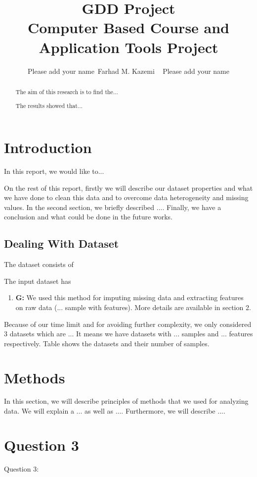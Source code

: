 \documentclass[12pt,letterpaper]{article}
\begin{document}
\title{GDD Project \\ \vspace{.5 cm} {\Large Computer Based Course and Application Tools Project} }
\author{Please add your name~Farhad M. Kazemi ~ Please add your name}
\maketitle
\begin{abstract}
The aim of this research is to find the...

The results showed that...
\end{abstract}

\section{Introduction}

In this report, we would like to...

On the rest of this report, firstly we will describe our dataset properties and what we have done to clean this data and to overcome data heterogeneity and missing values. In the second section, we briefly described ....
Finally, we have a conclusion and what could be done in the future works.
\subsection{Dealing With Dataset}
The dataset consists of 

The input dataset has 
\begin{enumerate}
\item \textbf{G:} We used this method for imputing missing data and extracting features on raw data (... sample with features). More details are available in section 2.
\end{enumerate}
\noindent Because of our time limit and for avoiding further complexity, we only considered 3 datasets which are ... 
It means we have datasets with ... samples and ... features respectively. Table shows the datasets and their number of samples.
\section{Methods}
In this section, we will describe principles of methods that we used for analyzing data. We will explain a ... as well as ....  Furthermore, we will describe .... 
\section{Question 3}
Question 3:
\end{document}
